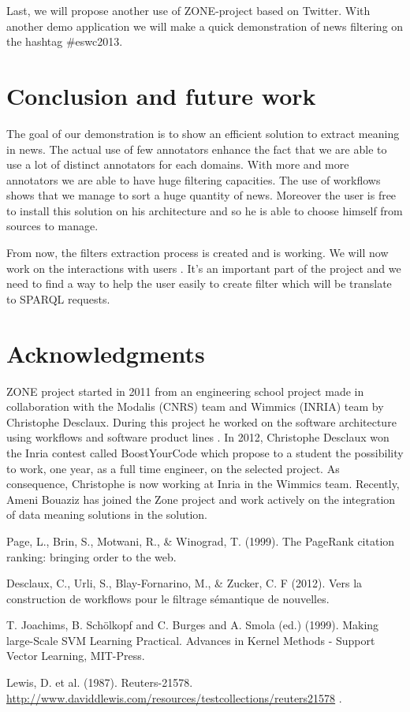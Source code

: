 \documentclass{llncs}
\begin{document}
Last, we will propose another use of ZONE-project based on Twitter. With another demo application we will make a quick demonstration of news filtering on the hashtag \#eswc2013.

\section{Conclusion and future work}
%
The goal of our demonstration is to show an efficient solution to extract meaning in news. The actual use of few annotators enhance the fact that we are able to use a lot of distinct annotators for each domains. With more and more annotators we are able to have huge filtering capacities. The use of workflows shows that we manage to sort a huge quantity of news. Moreover the user is free to install this solution on his architecture and so he is able to choose himself from sources to manage.

From now, the filters extraction process is created and is working. We will now work on the interactions with users . It's an important part of the project and we need to find a way to help the user easily to create filter which will be translate to SPARQL requests.

\section{Acknowledgments}
%
ZONE project started in 2011 from an engineering school project made in collaboration with the Modalis (CNRS) team and Wimmics (INRIA) team by Christophe Desclaux. During this project he worked on the software architecture using workflows and software product lines \cite{desclaux:urli}. In 2012, Christophe Desclaux won the Inria contest called BoostYourCode which propose to a student the possibility to work, one year, as a full time engineer, on the selected project. As consequence, Christophe is now working at Inria in the Wimmics team.  Recently, Ameni Bouaziz has joined the Zone project and work actively on the integration of data meaning solutions in the solution.
%
%
\begin{thebibliography}{5}
%
Page, L., Brin, S., Motwani, R., \& Winograd, T. (1999). The PageRank citation ranking: bringing order to the web.

Desclaux, C., Urli, S., Blay-Fornarino, M., \& Zucker, C. F (2012). Vers la construction de workflows pour le filtrage sémantique de nouvelles.

T. Joachims, B. Schölkopf and C. Burges and A. Smola (ed.) (1999). Making large-Scale SVM Learning Practical. Advances in Kernel Methods - Support Vector Learning, MIT-Press. 

Lewis, D. et al. (1987). Reuters-21578.
\url{http://www.daviddlewis.com/resources/testcollections/reuters21578}
.
\end{thebibliography}

\clearpage
\end{document}
